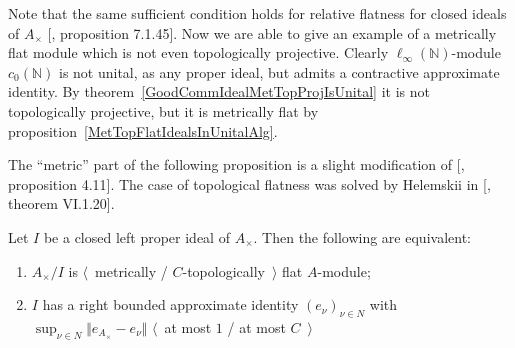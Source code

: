 Note that the same sufficient condition holds for relative flatness for closed ideals
of $A_\times$ [\cite{HelBanLocConvAlg}, proposition 7.1.45]. Now we are able to
give an example of a metrically flat module which is not even topologically
projective. Clearly $\ell_\infty(\mathbb{N})$-module $c_0(\mathbb{N})$ is not
unital, as any proper ideal, but admits a contractive approximate identity. By
theorem~\ref{GoodCommIdealMetTopProjIsUnital} it is not topologically
projective, but it is metrically flat by
proposition~\ref{MetTopFlatIdealsInUnitalAlg}.

The ``metric'' part of the following proposition is a slight modification of
[\cite{WhiteInjmoduAlg}, proposition 4.11]. The case of topological flatness was
solved by Helemskii in [\cite{HelHomolBanTopAlg}, theorem VI.1.20].

\begin{proposition}\label{MetTopFlatCycModCharac} Let $I$ be a closed left proper ideal
of $A_\times $. Then the following are equivalent:

\begin{enumerate}[label = (\roman*)]
    \item $A_\times /I$ is $\langle$~metrically / $C$-topologically~$\rangle$
    flat $A$-module;

    \item $I$ has a right bounded approximate identity ${(e_\nu)}_{\nu\in N}$
    with $\sup_{\nu\in N}\Vert e_{A_\times }-e_\nu\Vert$ $\langle$~at most $1$ /
    at most $C$~$\rangle$
\end{enumerate}
\end{proposition}
